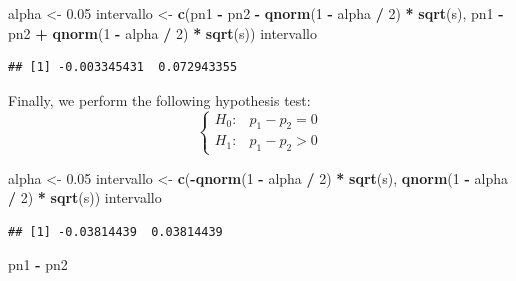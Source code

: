 \documentclass[
]{article}
\newenvironment{Shaded}{\begin{snugshade}}{\end{snugshade}}
\newcommand{\DecValTok}[1]{\textcolor[rgb]{0.00,0.00,0.81}{#1}}
\newcommand{\FloatTok}[1]{\textcolor[rgb]{0.00,0.00,0.81}{#1}}
\newcommand{\FunctionTok}[1]{\textcolor[rgb]{0.13,0.29,0.53}{\textbf{#1}}}
\newcommand{\NormalTok}[1]{#1}
\newcommand{\OtherTok}[1]{\textcolor[rgb]{0.56,0.35,0.01}{#1}}
\newcommand{\SpecialCharTok}[1]{\textcolor[rgb]{0.81,0.36,0.00}{\textbf{#1}}}
\begin{document}
\begin{Shaded}
\begin{Highlighting}[]
\NormalTok{alpha }\OtherTok{\textless{}{-}} \FloatTok{0.05}
\NormalTok{intervallo }\OtherTok{\textless{}{-}} \FunctionTok{c}\NormalTok{(pn1 }\SpecialCharTok{{-}}\NormalTok{ pn2 }\SpecialCharTok{{-}} \FunctionTok{qnorm}\NormalTok{(}\DecValTok{1} \SpecialCharTok{{-}}\NormalTok{ alpha }\SpecialCharTok{/} \DecValTok{2}\NormalTok{) }\SpecialCharTok{*} \FunctionTok{sqrt}\NormalTok{(s),}
\NormalTok{                 pn1 }\SpecialCharTok{{-}}\NormalTok{ pn2 }\SpecialCharTok{+} \FunctionTok{qnorm}\NormalTok{(}\DecValTok{1} \SpecialCharTok{{-}}\NormalTok{ alpha }\SpecialCharTok{/} \DecValTok{2}\NormalTok{) }\SpecialCharTok{*} \FunctionTok{sqrt}\NormalTok{(s))}
\NormalTok{intervallo}
\end{Highlighting}
\end{Shaded}

\begin{verbatim}
## [1] -0.003345431  0.072943355
\end{verbatim}

Finally, we perform the following hypothesis test: \[
\begin{cases}
H_0:& p_1 - p_2 = 0 \\
H_1:& p_1 - p_2 > 0
\end{cases}
\]

\begin{Shaded}
\begin{Highlighting}[]
\NormalTok{alpha }\OtherTok{\textless{}{-}} \FloatTok{0.05}
\NormalTok{intervallo }\OtherTok{\textless{}{-}} \FunctionTok{c}\NormalTok{(}\SpecialCharTok{{-}}\FunctionTok{qnorm}\NormalTok{(}\DecValTok{1} \SpecialCharTok{{-}}\NormalTok{ alpha }\SpecialCharTok{/} \DecValTok{2}\NormalTok{) }\SpecialCharTok{*} \FunctionTok{sqrt}\NormalTok{(s),}
                 \FunctionTok{qnorm}\NormalTok{(}\DecValTok{1} \SpecialCharTok{{-}}\NormalTok{ alpha }\SpecialCharTok{/} \DecValTok{2}\NormalTok{) }\SpecialCharTok{*} \FunctionTok{sqrt}\NormalTok{(s))}
\NormalTok{intervallo}
\end{Highlighting}
\end{Shaded}

\begin{verbatim}
## [1] -0.03814439  0.03814439
\end{verbatim}

\begin{Shaded}
\begin{Highlighting}[]
\NormalTok{pn1 }\SpecialCharTok{{-}}\NormalTok{ pn2 }
\end{Highlighting}
\end{Shaded}
\end{document}

